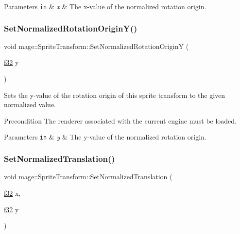 \begin{DoxyParams}[1]{Parameters}
\mbox{\tt in}  & {\em x} & The x-\/value of the normalized rotation origin. \\
\hline
\end{DoxyParams}
\hypertarget{structmage_1_1_sprite_transform_ac8546235b4090463eae78a990551c4f3}{}\label{structmage_1_1_sprite_transform_ac8546235b4090463eae78a990551c4f3} 
\subsubsection{\texorpdfstring{Set\+Normalized\+Rotation\+Origin\+Y()}{SetNormalizedRotationOriginY()}}
{\footnotesize\ttfamily void mage\+::\+Sprite\+Transform\+::\+Set\+Normalized\+Rotation\+OriginY (\begin{DoxyParamCaption}\item[{\hyperlink{namespacemage_a6a44ad388483959dc4dff9f2aef91431}{f32}}]{y }\end{DoxyParamCaption})}

Sets the y-\/value of the rotation origin of this sprite transform to the given normalized value.

\begin{DoxyPrecond}{Precondition}
The renderer associated with the current engine must be loaded. 
\end{DoxyPrecond}

\begin{DoxyParams}[1]{Parameters}
\mbox{\tt in}  & {\em y} & The y-\/value of the normalized rotation origin. \\
\hline
\end{DoxyParams}
\hypertarget{structmage_1_1_sprite_transform_a23174a0b3381d1c700c2fcf500e58e8f}{}\label{structmage_1_1_sprite_transform_a23174a0b3381d1c700c2fcf500e58e8f} 
\subsubsection{\texorpdfstring{Set\+Normalized\+Translation()}{SetNormalizedTranslation()}\hspace{0.1cm}{\footnotesize\ttfamily [1/3]}}
{\footnotesize\ttfamily void mage\+::\+Sprite\+Transform\+::\+Set\+Normalized\+Translation (\begin{DoxyParamCaption}\item[{\hyperlink{namespacemage_a6a44ad388483959dc4dff9f2aef91431}{f32}}]{x,  }\item[{\hyperlink{namespacemage_a6a44ad388483959dc4dff9f2aef91431}{f32}}]{y }\end{DoxyParamCaption})}


